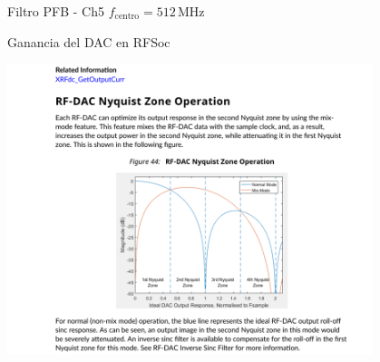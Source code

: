 \documentclass[ignorenonframetext,12pt]{beamer}
\begin{document}
\begin{frame}{Filtro PFB - Ch5 $f_\text{centro}= 512\,\text{MHz}$}
\begin{center}
        \end{center}
\end{frame}
\begin{frame}{Ganancia del DAC en RFSoc}
        \begin{center}
                \includegraphics[width=0.8\textwidth]{dac_gain}
        \end{center}
\end{frame}
\end{document}
